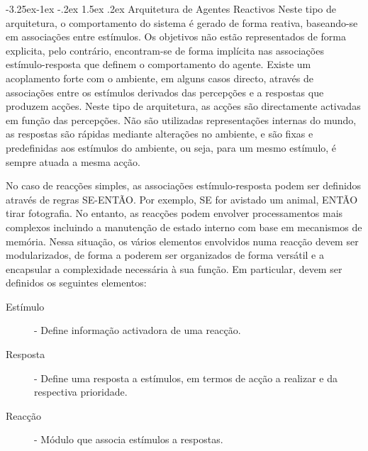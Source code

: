 \documentclass[a4paper,12pt]{article}
\makeatletter
\renewcommand\paragraph{\@startsection{paragraph}{4}{\z@}%
                {-3.25ex\@plus -1ex \@minus -.2ex}%
                {1.5ex \@plus .2ex}%
                {\normalfont\normalsize\bfseries}}
\makeatother
\begin{document}
\newpage
\paragraph{Arquitetura de Agentes Reactivos} \label{arquitetura_de_agentes_reactivos}
Neste tipo de arquitetura, o comportamento do sistema é gerado de forma reativa, baseando-se em associações entre estímulos. Os objetivos não estão representados de forma explicita, pelo contrário, encontram-se de forma implícita nas associações estímulo-resposta que definem o comportamento do agente.
Existe um acoplamento forte com o ambiente, em alguns casos directo, através de associações entre os estímulos derivados das percepções e a respostas que produzem acções.
Neste tipo de arquitetura, as acções são directamente activadas em função das percepções. Não são utilizadas representações internas do mundo, as respostas são rápidas mediante alterações no ambiente, e são fixas e predefinidas aos estímulos do ambiente, ou seja, para um mesmo estímulo, é sempre atuada a mesma acção.

No caso de reacções simples, as associações estímulo-resposta podem ser definidos através de regras SE-ENTÃO. Por exemplo, SE for avistado um animal, ENTÃO tirar fotografia.
No entanto, as reacções podem envolver processamentos mais complexos incluindo a manutenção de estado interno com base em mecanismos de memória. Nessa situação, os vários elementos envolvidos numa reacção devem ser modularizados, de forma a poderem ser organizados de forma versátil e a encapsular a complexidade necessária à sua função. Em particular, devem ser definidos os seguintes elementos:

\begin{description}
	\item[Estímulo] - Define informação activadora de uma reacção.
	\item[Resposta] - Define uma resposta a estímulos, em termos de acção a realizar e da respectiva prioridade.
	\item[Reacção] - Módulo que associa estímulos a respostas.
\end{description}
\end{document}

